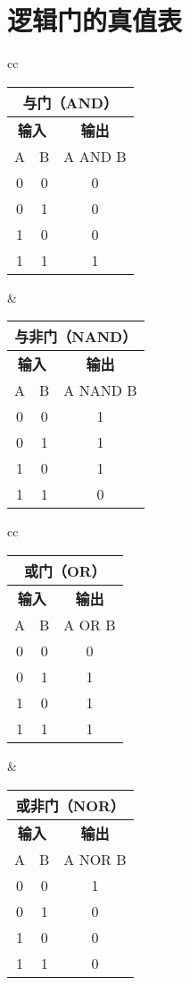 \newpage

\section{逻辑门的真值表}


\begin{tabular}{cc}%
	\begin{tabular}{|c|c|c|}
		\multicolumn{3}{c}{\textbf{与门（AND）}} \\
		\hline
		\multicolumn{2}{|c|}{\textbf{输入}} & \textbf{输出} \\
		\hline
		A & B & A AND B \\
		\hline
		0 & 0 & 0 \\
		\hline
		0 & 1 & 0 \\
		\hline
		1 & 0 & 0 \\
		\hline
		1 & 1 & 1 \\
		\hline
	\end{tabular} &
	\begin{tabular}{|c|c|c|}
		\multicolumn{3}{c}{\textbf{与非门（NAND）}} \\
		\hline
		\multicolumn{2}{|c|}{\textbf{输入}} & \textbf{输出} \\
		\hline
		A & B & A NAND B \\
		\hline
		0 & 0 & 1 \\
		\hline
		0 & 1 & 1 \\
		\hline
		1 & 0 & 1 \\
		\hline
		1 & 1 & 0 \\
		\hline
	\end{tabular} \tabularnewline
\end{tabular}

\bigskip

\begin{tabular}{cc}%
	\begin{tabular}{|c|c|c|}
		\multicolumn{3}{c}{\textbf{或门（OR）}} \\
		\hline
		\multicolumn{2}{|c|}{\textbf{输入}} & \textbf{输出} \\
		\hline
		A & B & A OR B \\
		\hline
		0 & 0 & 0 \\
		\hline
		0 & 1 & 1 \\
		\hline
		1 & 0 & 1 \\
		\hline
		1 & 1 & 1 \\
		\hline
	\end{tabular} &
	\begin{tabular}{|c|c|c|}
		\multicolumn{3}{c}{\textbf{或非门（NOR）}} \\
		\hline
		\multicolumn{2}{|c|}{\textbf{输入}} & \textbf{输出} \\
		\hline
		A & B & A NOR B \\
		\hline
		0 & 0 & 1 \\
		\hline
		0 & 1 & 0 \\
		\hline
		1 & 0 & 0 \\
		\hline
		1 & 1 & 0 \\
		\hline
	\end{tabular}  \tabularnewline
\end{tabular}

